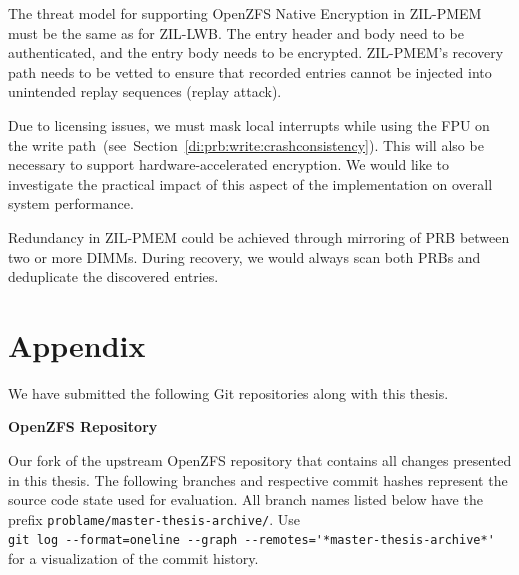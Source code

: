 \documentclass[12pt,a4paper,twoside]{book}
\begin{document}
{\begin{description}[noitemsep,leftmargin=1.5cm,labelindent=1cm]
    \item[Support for Native Encryption] The threat model for supporting \mbox{OpenZFS} Native Encryption in ZIL-PMEM must be the same as for ZIL-LWB.
        The entry header and body need to be authenticated, and the entry body needs to be encrypted.
        ZIL-PMEM's recovery path needs to be vetted to ensure that recorded entries cannot be injected into unintended replay sequences (replay attack).

    \item[System-Wide Impact Of Interrupt Masking] Due to licensing issues, we must mask local interrupts while using the FPU on the write path~(see~Section~\ref{di:prb:write:crashconsistency}).
        This will also be necessary to support hardware-accelerated encryption.
        We would like to investigate the practical impact of this aspect of the implementation on overall system performance.

    \item[Redundancy Through Mirroring] Redundancy in ZIL-PMEM could be achieved through mirroring of PRB between two or more DIMMs.
        During recovery, we would always scan both PRBs and deduplicate the discovered entries.
\end{description}

\backmatter

\chapter{Appendix}\label{ch:appendix}

We have submitted the following Git repositories along with this thesis.

\newcommand{\appendixsection}[1]{\textbf{\large #1}}

\appendixsection{OpenZFS Repository}

Our fork of the upstream OpenZFS repository that contains all changes presented in this thesis.
The following branches and respective commit hashes represent the source code state used for evaluation.
All branch names listed below have the prefix \lstinline{problame/master-thesis-archive/}.
Use \\ \lstinline{git log --format=oneline --graph --remotes='*master-thesis-archive*'} for a visualization of the commit history.

}
\end{document}
